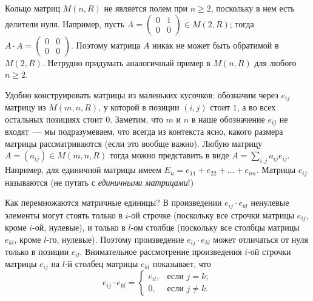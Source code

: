 \begin{remark}
Кольцо матриц $M(n,R)$ не является полем при $n\geq 2$, поскольку в
нем есть делители нуля. Например, пусть $A=\begin{pmatrix}0 & 1\\0 &
  0\end{pmatrix}\in M(2,R)$; тогда $A\cdot A=\begin{pmatrix}0 & 0\\0 &
  0\end{pmatrix}$. Поэтому матрица $A$ никак не может быть обратимой в
$M(2,R)$. Нетрудно придумать аналогичный пример в $M(n,R)$ для любого
$n\geq 2$.
\end{remark}

Удобно конструировать матрицы из маленьких кусочков: обозначим через
$e_{ij}$ матрицу из $M(m,n,R)$, у которой в позиции $(i,j)$ стоит $1$,
а во всех остальных позициях стоит $0$. Заметим, что $m$ и $n$ в наше
обозначение $e_{ij}$ не входят~--- мы подразумеваем, что всегда из
контекста ясно, какого размера матрицы рассматриваются (если это
вообще важно).
Любую матрицу $A=(a_{ij})\in M(m,n,R)$ тогда можно представить в виде
$A=\sum_{i,j}a_{ij}e_{ij}$. Например, для единичной матрицы имеем
$E_n=e_{11}+e_{22}+\dots+e_{nn}$.
Матрицы $e_{ij}$ называются  (не путать с
{\it единичными матрицами}!)

Как перемножаются матричные единицы? В произведении $e_{ij}\cdot
e_{kl}$ ненулевые элементы могут стоять только в $i$-ой строчке
(поскольку все строчки матрицы $e_{ij}$, кроме $i$-ой, нулевые), и
только в $l$-ом столбце (поскольку все столбцы матрицы $e_{kl}$, кроме
$l$-го, нулевые). Поэтому произведение $e_{ij}\cdot e_{kl}$ может
отличаться от нуля только в позиции $e_{il}$. Внимательное
рассмотрение произведения $i$-ой строчки матрицы $e_{ij}$ на $l$-й
столбец матрицы $e_{kl}$ показывает, что
$$e_{ij}\cdot e_{kl}=\begin{cases}e_{il}, &\text{если }j=k;\\ 0,
  &\text{если }j\neq k.\end{cases}$$

